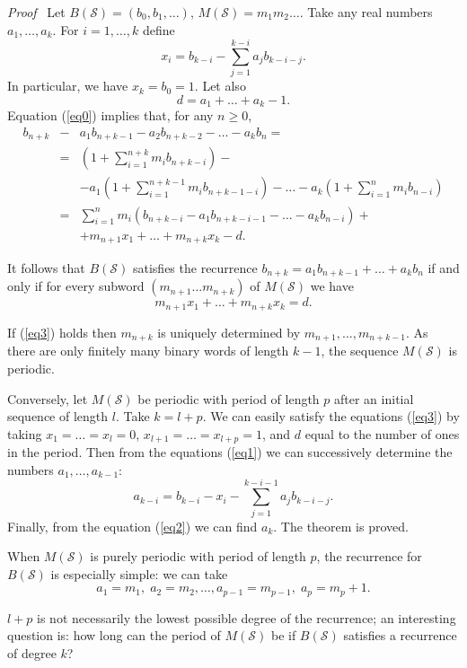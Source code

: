 \documentclass[12pt]{article}
\newcommand{\head}[1]{\medbreak\noindent\textit{#1}\ }
\begin{document}
\head{Proof} Let $B(\mathcal{S})=(b_0,b_1,\ldots)$,
$M(\mathcal{S})=m_1m_2\ldots$.
Take any real numbers $a_1,\ldots,a_k$. For $i=1,\ldots,k$ define
\begin{equation}\label{eq1}
x_i=b_{k-i}-\sum_{j=1}^{k-i}a_jb_{k-i-j}.
\end{equation}
In particular, we have $x_k=b_0=1$. Let also
\begin{equation}\label{eq2}
d=a_1+\ldots+a_k-1.
\end{equation}
Equation (\ref{eq0}) implies that, for any $n\geq 0$,
\begin{eqnarray*}
b_{n+k}&-&a_1b_{n+k-1}-a_2b_{n+k-2}-\ldots-a_kb_n=\\
&=&(1+\sum_{i=1}^{n+k}m_ib_{n+k-i})-\\
&&-a_1(1+\sum_{i=1}^{n+k-1}m_ib_{n+k-1-i})-\ldots
-a_k(1+\sum_{i=1}^{n}m_ib_{n-i})\\
&=&\sum_{i=1}^{n}m_i(b_{n+k-i}-a_1b_{n+k-i-1}-\ldots-a_kb_{n-i})+\\
&&+m_{n+1}x_1+\ldots+m_{n+k}x_k-d.
\end{eqnarray*}

It follows that $B(\mathcal{S})$ satisfies the recurrence
$b_{n+k}=a_1b_{n+k-1}+\ldots+a_kb_n$ if and only if for every subword
$(m_{n+1}\ldots m_{n+k})$ of $M(\mathcal{S})$ we have
\begin{equation}\label{eq3}
m_{n+1}x_1+\ldots+m_{n+k}x_k=d.
\end{equation}

If (\ref{eq3}) holds then $m_{n+k}$ is uniquely determined by
$m_{n+1},\ldots,m_{n+k-1}$. As there are only finitely many binary words
of length $k-1$, the sequence $M(\mathcal{S})$ is periodic.

Conversely, let $M(\mathcal{S})$ be periodic with period of length $p$
after an initial sequence of length $l$. Take $k=l+p$. We can easily
satisfy the equations (\ref{eq3}) by taking $x_1=\ldots=x_l=0$,
$x_{l+1}=\ldots=x_{l+p}=1$, and $d$ equal to the number of ones
in the period. Then from the equations (\ref{eq1}) we can successively
determine the numbers $a_1,\ldots,a_{k-1}$:
$$a_{k-i}=b_{k-i}-x_i-\sum_{j=1}^{k-i-1}a_jb_{k-i-j}.$$
Finally, from the equation (\ref{eq2}) we can find $a_k$.
The theorem is proved.

When $M(\mathcal{S})$ is purely periodic with period of length $p$, the
recurrence for $B(\mathcal{S})$ is especially simple: we can take
$$a_1=m_1,\;a_2=m_2,\ldots,a_{p-1}=m_{p-1},\;a_p=m_p+1.$$

$l+p$ is not necessarily the lowest possible degree of the recurrence;
an interesting question is: how long can the period of $M(\mathcal{S})$ be
if $B(\mathcal{S})$ satisfies a recurrence of degree $k$?
\end{document}
